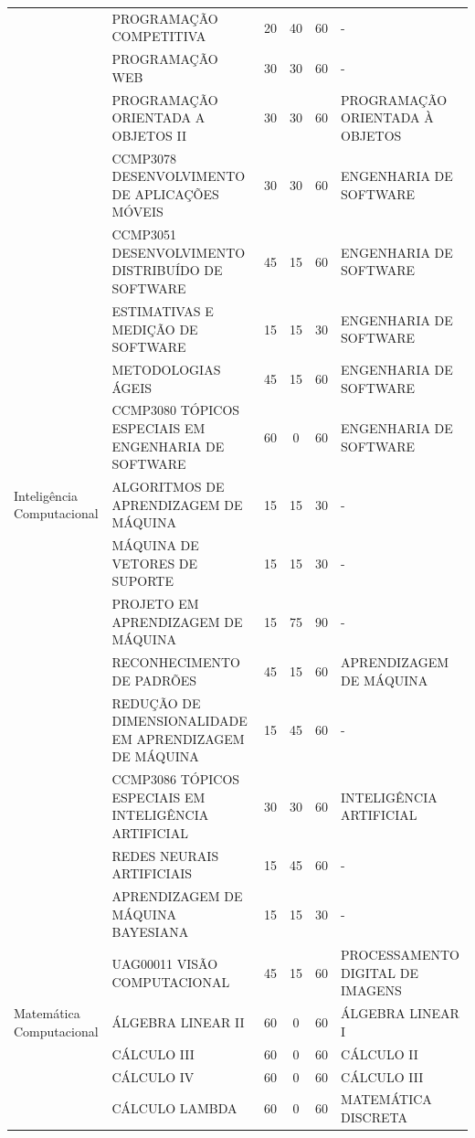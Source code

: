 \documentclass[
	12pt,				%
	openright,			%
  oneside,     %
	a4paper,			%
 hyphens,
	chapter=TITLE,		%
	english,			%
	french,				%
	spanish,			%
	brazil				%
	]{abntex2}
\begin{document}
\begin{center}
\begin{tiny}
\begin{longtable}{p{2.5cm}p{5.5cm}cccp{3.3cm}}
      & PROGRAMAÇÃO COMPETITIVA & 20 & 40 & 60 & - \\ \cline{2-6}
      & PROGRAMAÇÃO WEB & 30 & 30 & 60 & - \\ \cline{2-6}
      & PROGRAMAÇÃO ORIENTADA A OBJETOS II & 30 & 30 & 60 & PROGRAMAÇÃO ORIENTADA À OBJETOS \\ \cline{2-6}
      & CCMP3078 DESENVOLVIMENTO DE APLICAÇÕES MÓVEIS & 30 & 30 & 60 & ENGENHARIA DE SOFTWARE \\ \cline{2-6}
      & CCMP3051 DESENVOLVIMENTO DISTRIBUÍDO DE SOFTWARE & 45 & 15 & 60 & ENGENHARIA DE SOFTWARE \\ \cline{2-6}
      & ESTIMATIVAS E MEDIÇÃO DE SOFTWARE & 15 & 15 & 30 & ENGENHARIA DE SOFTWARE \\ \cline{2-6}
      & METODOLOGIAS ÁGEIS & 45 & 15 & 60 & ENGENHARIA DE SOFTWARE \\ \cline{2-6}
      & CCMP3080 TÓPICOS ESPECIAIS EM ENGENHARIA DE SOFTWARE & 60 & 0 & 60 & ENGENHARIA DE SOFTWARE \\ \midrule
    Inteligência Computacional & ALGORITMOS DE APRENDIZAGEM DE MÁQUINA & 15 & 15 & 30 & - \\ \cline{2-6}
      & MÁQUINA DE VETORES DE SUPORTE & 15 & 15 & 30 & - \\ \cline{2-6}
      & PROJETO EM APRENDIZAGEM DE MÁQUINA & 15 & 75 & 90 & - \\ \cline{2-6}
      & RECONHECIMENTO DE PADRÕES & 45 & 15 & 60 & APRENDIZAGEM DE MÁQUINA \\ \cline{2-6}
      & REDUÇÃO DE DIMENSIONALIDADE EM APRENDIZAGEM DE MÁQUINA & 15 & 45 & 60 & - \\ \cline{2-6}
      & CCMP3086 TÓPICOS ESPECIAIS EM INTELIGÊNCIA ARTIFICIAL & 30 & 30 & 60 & INTELIGÊNCIA ARTIFICIAL \\ \cline{2-6}
      & REDES NEURAIS ARTIFICIAIS & 15 & 45 & 60 & - \\ \cline{2-6}
      & APRENDIZAGEM DE MÁQUINA BAYESIANA & 15 & 15 & 30 & - \\ \cline{2-6}
      & UAG00011 VISÃO COMPUTACIONAL & 45 & 15 & 60 & PROCESSAMENTO DIGITAL DE IMAGENS \\ \midrule
    Matemática Computacional & ÁLGEBRA LINEAR II & 60 & 0 & 60 & ÁLGEBRA LINEAR I \\ \cline{2-6}
      & CÁLCULO III & 60 & 0 & 60 & CÁLCULO II \\ \cline{2-6}
      & CÁLCULO IV & 60 & 0 & 60 & CÁLCULO III \\ \cline{2-6}
      & CÁLCULO LAMBDA & 60 & 0 & 60 & MATEMÁTICA DISCRETA \\ \cline{2-6}

\end{longtable}
\end{tiny}
\end{center}
\end{document}
